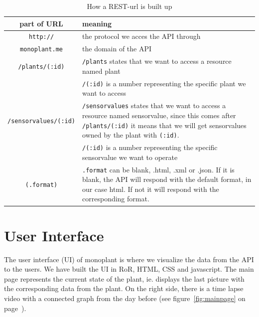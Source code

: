 \bgroup
\def\arraystretch{1.8}	%
\begin{table}
	\centering
	\begin{tabular}{|c|p{250pt}|} \hline
		\textbf{part of URL}&	\textbf{meaning}\\ \hline
		\texttt{http://}&	the protocol we acces the API through\\ \hline
		\texttt{monoplant.me}&	the domain of the API\\ \hline
		\texttt{/plants/(:id)}&	\texttt{/plants} states that we want to access a resource named plant \\ &
		\texttt{/(:id)} is a number representing the specific plant we want to access\\ \hline
		\texttt{/sensorvalues/(:id)}&	\texttt{/sensorvalues} states that we want to access a resource named sensorvalue, since this comes after \texttt{/plants/(:id)} it means that we will get sensorvalues owned by the plant with \texttt{(:id)}. \\ &
		\texttt{/(:id)} is a number representing the specific sensorvalue we want to operate\\ \hline
		\texttt{(.format)}&	 \texttt{.format} can be blank, .html, .xml or .json. If it is blank, the API will respond with the default format, in our case html. If not it will respond with the corresponding format.\\ \hline
	\end{tabular}
	\caption{How a REST-url is built up}
	\label{fig:RESTurl}
\end{table}
\egroup

\section{User Interface}
The user interface (UI) of monoplant is where we visualize the data from the API to the users. We have built the UI in RoR, HTML, CSS and javascript. The main page represents the current state of the plant, ie. displays the last picture with the corresponding data from the plant. On the right side, there is a time lapse video with a connected graph from the day before (see figure~\ref{fig:mainpage} on page~\pageref{fig:mainpage}).

